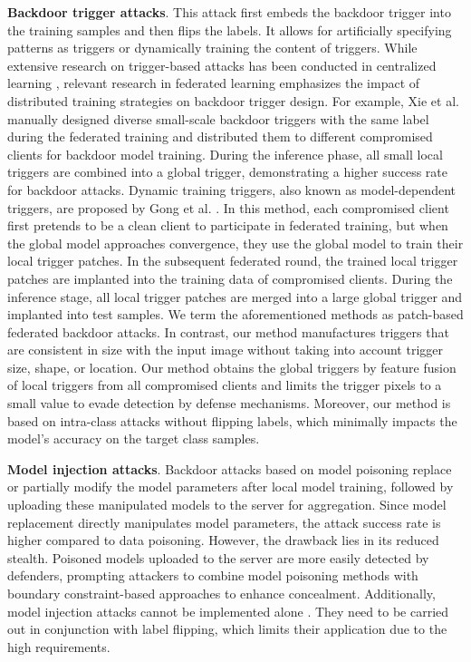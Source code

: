 \textbf{Backdoor trigger attacks}. This attack first embeds the backdoor trigger into the training samples and then flips the labels. It allows for artificially specifying patterns as triggers or dynamically training the content of triggers. While extensive research on trigger-based attacks has been conducted in centralized learning \cite{R41}, relevant research in federated learning emphasizes the impact of distributed training strategies on backdoor trigger design. For example, Xie et al. \cite{R7} manually designed diverse small-scale backdoor triggers with the same label during the federated training and distributed them to different compromised clients for backdoor model training. During the inference phase, all small local triggers are combined into a global trigger, demonstrating a higher success rate for backdoor attacks. Dynamic training triggers, also known as model-dependent triggers, are proposed by Gong et al. \cite{R9}. In this method, each compromised client first pretends to be a clean client to participate in federated training, but when the global model approaches convergence, they use the global model to train their local trigger patches. In the subsequent federated round, the trained local trigger patches are implanted into the training data of compromised clients. During the inference stage, all local trigger patches are merged into a large global trigger and implanted into test samples. We term the aforementioned methods as patch-based federated backdoor attacks. In contrast, our method manufactures triggers that are consistent in size with the input image without taking into account trigger size, shape, or location. Our method obtains the global triggers by feature fusion of local triggers from all compromised clients and limits the trigger pixels to a small value to evade detection by defense mechanisms. Moreover, our method is based on intra-class attacks without flipping labels, which minimally impacts the model's accuracy on the target class samples.

\textbf{Model injection attacks}. Backdoor attacks based on model poisoning replace \cite{R8} or partially modify \cite{R38} the model parameters after local model training, followed by uploading these manipulated models to the server for aggregation. Since model replacement directly manipulates model parameters, the attack success rate is higher compared to data poisoning. However, the drawback lies in its reduced stealth. Poisoned models uploaded to the server are more easily detected by defenders, prompting attackers to combine model poisoning methods with boundary constraint-based approaches \cite{R11} to enhance concealment. Additionally, model injection attacks cannot be implemented alone \cite{R8}. They need to be carried out in conjunction with label flipping, which limits their application due to the high requirements.

